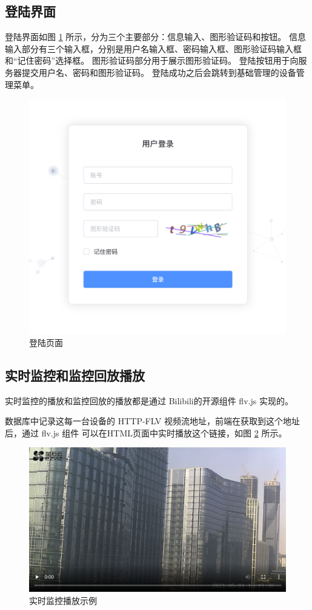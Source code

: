 \subsection{登陆界面}

登陆界面如图 \ref{Fig:login} 所示，分为三个主要部分：信息输入、图形验证码和按钮。
信息输入部分有三个输入框，分别是用户名输入框、密码输入框、图形验证码输入框和“记住密码”选择框。
图形验证码部分用于展示图形验证码。
登陆按钮用于向服务器提交用户名、密码和图形验证码。
登陆成功之后会跳转到基础管理的设备管理菜单。

\begin{figure}[ht]
    \centering
    \includegraphics[width=0.9\linewidth]{./Figure/IMG_login.png}
    \caption{登陆页面}\label{Fig:login}
\end{figure}

\subsection{实时监控和监控回放播放}
实时监控的播放和监控回放的播放都是通过 Bilibili的开源组件 flv.js 实现的。

数据库中记录这每一台设备的 HTTP-FLV 视频流地址，前端在获取到这个地址后，通过 flv.js 组件
可以在HTML页面中实时播放这个链接，如图 \ref{Fig:record_eg} 所示。

\begin{figure}[ht]
    \centering
    \includegraphics[width=0.9\linewidth]{./Figure/IMG_record_eg.png}
    \caption{实时监控播放示例}\label{Fig:record_eg}
\end{figure}

